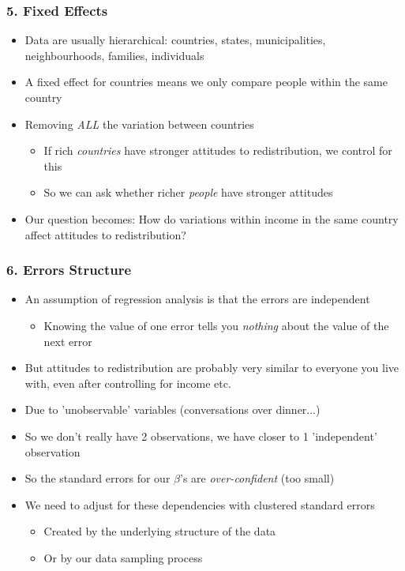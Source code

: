 \documentclass[xcolor=x11names,compress]{beamer}\usepackage[]{graphicx}\usepackage[]{color}
\renewcommand{\(}{\begin{columns}}
\renewcommand{\)}{\end{columns}}
\newcommand{\<}[1]{\begin{column}{#1}}
\renewcommand{\>}{\end{column}}
\begin{document}
\begin{frame}
\frametitle{5. Fixed Effects}
\begin{itemize}
\item Data are usually hierarchical: countries, states, municipalities, neighbourhoods, families, individuals
\pause
\item A fixed effect for countries means we only compare people within the same country
\pause
\item Removing \textit{ALL} the variation between countries
\begin{itemize}
\item If rich \textit{countries} have stronger attitudes to redistribution, we control for this
\item So we can ask whether richer \textit{people} have stronger attitudes
\end{itemize}
\pause
\item Our question becomes: How do variations within income in the same country affect attitudes to redistribution?
\end{itemize}
\end{frame}

\begin{frame}
\frametitle{6. Errors Structure}
\begin{itemize}
\item An assumption of regression analysis is that the errors are independent
\pause
\begin{itemize}
\item Knowing the value of one error tells you \textit{nothing} about the value of the next error
\end{itemize}
\pause
\item But attitudes to redistribution are probably very similar to everyone you live with, even after controlling for income etc. 
\pause
\item Due to 'unobservable' variables (conversations over dinner...)
\pause
\item So we don't really have 2 observations, we have closer to 1 'independent' observation
\pause
\item So the standard errors for our $\beta$'s are \textit{over-confident} (too small)
\pause
\item We need to adjust for these dependencies with clustered standard errors
\begin{itemize}
\item Created by the underlying structure of the data
\item Or by our data sampling process
\end{itemize}
\end{itemize}
\end{frame}
\end{document}
